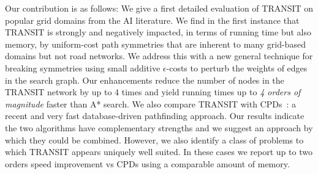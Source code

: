 Our contribution is as follows:
We give a first detailed evaluation of TRANSIT on popular grid domains from the AI literature.
We find in the first instance that TRANSIT is strongly and negatively impacted,
in terms of running time but also memory, by uniform-cost path symmetries that
are inherent to many grid-based domains but not road networks.
We address this with a new general technique for breaking symmetries using
small additive $\epsilon$-costs to perturb the weights of edges in the search graph.
Our enhancements reduce the number of nodes in the TRANSIT network by up to 4 times
and yield running times up to \emph{4 orders of magnitude} faster than A* search.
We also compare TRANSIT with CPDs~\cite{botea11}: a recent and very
fast database-driven pathfinding approach. Our results indicate the two algorithms
have complementary strengths and we suggest an approach by which they could be combined.
However, we also identify a class of problems to which TRANSIT appears uniquely well suited.
In these cases we report up to two orders speed improvement vs CPDs using a comparable
amount of memory.

